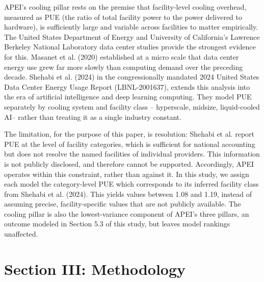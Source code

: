 \documentclass[11pt]{article}
\begin{document}
APEI's cooling pillar rests on the premise that facility-level cooling overhead, measured as PUE (the ratio of total facility power to the power delivered to hardware), is sufficiently large and variable across facilities to matter empirically. The United States Department of Energy and University of California's Lawrence Berkeley National Laboratory data center studies provide the strongest evidence for this. Masanet et al. (2020) established at a micro scale that data center energy use grew far more slowly than computing demand over the preceding decade. Shehabi et al. (2024) in the congressionally mandated 2024 United States Data Center Energy Usage Report (LBNL-2001637), extends this analysis into the era of artificial intelligence and deep learning computing. They model PUE separately by cooling system and facility class -- hyperscale, midsize, liquid-cooled AI-- rather than treating it as a single industry constant.

The limitation, for the purpose of this paper, is resolution: Shehabi et al. report PUE at the level of facility categories, which is sufficient for national accounting but does not resolve the named facilities of individual providers. This information is not publicly disclosed, and therefore cannot be supported. Accordingly, APEI operates within this constraint, rather than against it. In this study, we assign each model the category-level PUE which corresponds to its inferred facility class from Shehabi et al. (2024). This yields values between 1.08 and 1.19, instead of assuming precise, facility-specific values that are not publicly available. The cooling pillar is also the lowest-variance component of APEI's three pillars, an outcome modeled in Section 5.3 of this study, but leaves model rankings unaffected.

\section*{Section III: Methodology}
\end{document}
